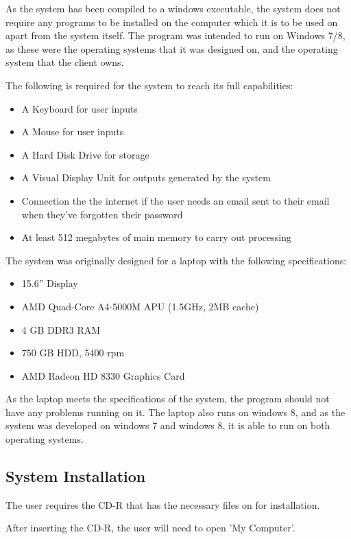 As the system has been compiled to a windows executable, the system does not require any programs to be installed on the computer which it is to be used on apart from the system itself. The program was intended to run on Windows 7/8, as these were the operating systems that it was designed on, and the operating system that the client owns.

The following is required for the system to reach its full capabilities:

\begin{itemize}
    \item A Keyboard for user inputs
    \item A Mouse for user inputs
    \item A Hard Disk Drive for storage
    \item A Visual Display Unit for outputs generated by the system
    \item Connection the the internet if the user needs an email sent to their email when they've forgotten their password
    \item At least 512 megabytes of main memory to carry out processing
\end{itemize}

The system was originally designed for a laptop with the following specifications:

\begin{itemize}
    \item 15.6” Display
    \item AMD Quad-Core A4-5000M APU (1.5GHz, 2MB cache)
    \item 4 GB DDR3 RAM
    \item 750 GB HDD, 5400 rpm
    \item AMD Radeon HD 8330 Graphics Card
\end{itemize}

As the laptop meets the specifications of the system, the program should not have any problems running on it. The laptop also runs on windows 8, and as the system was developed on windows 7 and windows 8, it is able to run on both operating systems.

\subsection{System Installation}

The user requires the CD-R that has the necessary files on for installation. 


After inserting the CD-R, the user will need to open 'My Computer'.

